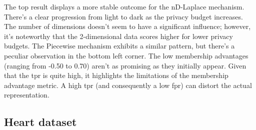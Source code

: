 The top result displays a more stable outcome for the nD-Laplace mechanism. There's a clear progression from light to dark as the privacy budget increases. The number of dimensions doesn't seem to have a significant influence; however, it's noteworthy that the 2-dimensional data scores higher for lower privacy budgets. The Piecewise mechanism exhibits a similar pattern, but there's a peculiar observation in the bottom left corner. The low membership advantages (ranging from -0.50 to 0.70) aren't as promising as they initially appear. Given that the \gls{tpr} is quite high, it highlights the limitations of the membership advantage metric. A high \gls{tpr} (and consequently a low \gls{fpr}) can distort the actual representation.

\newpage
\subsection{Heart dataset}
